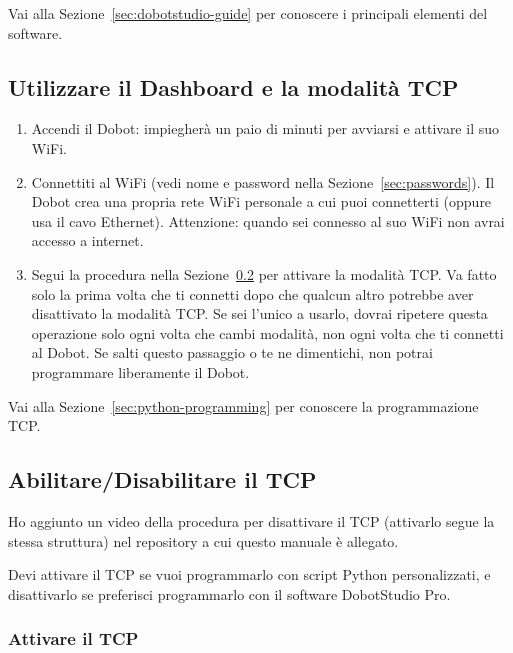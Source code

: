\documentclass[11pt,a4paper]{article}
\begin{document}
Vai alla Sezione~\ref{sec:dobotstudio-guide} per conoscere i principali elementi del software.

\subsection{Utilizzare il Dashboard e la modalità TCP}
\label{sec:connecting-dashboard}

\begin{enumerate}[leftmargin=1.2cm]
    \item Accendi il Dobot: impiegherà un paio di minuti per avviarsi e attivare il suo WiFi.
    \item Connettiti al WiFi (vedi nome e password nella Sezione~\ref{sec:passwords}). Il Dobot crea una propria rete WiFi personale a cui puoi connetterti (oppure usa il cavo Ethernet). Attenzione: quando sei connesso al suo WiFi non avrai accesso a internet.
    \item Segui la procedura nella Sezione~\ref{sec:enabling-disabling-tcp} per attivare la modalità TCP. Va fatto solo la prima volta che ti connetti dopo che qualcun altro potrebbe aver disattivato la modalità TCP. Se sei l'unico a usarlo, dovrai ripetere questa operazione solo ogni volta che cambi modalità, non ogni volta che ti connetti al Dobot. Se salti questo passaggio o te ne dimentichi, non potrai programmare liberamente il Dobot.
\end{enumerate}

Vai alla Sezione~\ref{sec:python-programming} per conoscere la programmazione TCP.

\subsection{Abilitare/Disabilitare il TCP}
\label{sec:enabling-disabling-tcp}

Ho aggiunto un video della procedura per disattivare il TCP (attivarlo segue la stessa struttura) nel repository a cui questo manuale è allegato.

Devi attivare il TCP se vuoi programmarlo con script Python personalizzati, e disattivarlo se preferisci programmarlo con il software DobotStudio Pro.

\subsubsection*{Attivare il TCP}
\end{document}

